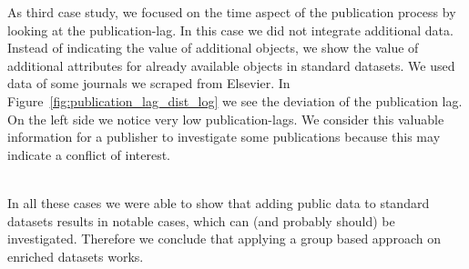 \documentclass{ou-report}
\newcommand{\doi}{{DOI}}
\begin{document}
As third case study, we focused on the time aspect of the publication process by 
looking at the publication-lag. In this case we did not integrate additional 
data. Instead of indicating the value of additional objects, we show the value 
of additional attributes for already available objects in standard datasets. We 
used data of some journals we scraped from Elsevier. In 
Figure~\ref{fig:publication_lag_dist_log} we see the deviation of the 
publication lag. On the left side we notice very low publication-lags. We 
consider this valuable information for a publisher to investigate some 
publications because this may indicate a conflict of interest.

\ \\
In all these cases we were able to show that adding public data to standard 
datasets results in notable cases, which can (and probably should) be 
investigated. Therefore we conclude that applying a group based approach on 
enriched datasets works.










\end{document}
